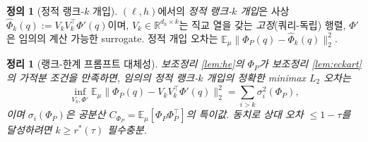 \documentclass[11pt]{article}
\newtheorem{theorem}{정리}
\theoremstyle{definition}
\newtheorem{definition}{정의}
\newcommand{\R}{\mathbb{R}}
\newcommand{\E}{\mathbb{E}}
\newcommand{\Phip}{\Phi_P}
\newcommand{\dh}{d_h}
\begin{document}
\begin{definition}[정적 랭크-$k$ 개입]
\label{def:static-k}
$(\ell,h)$에서의 \emph{정적 랭크-$k$ 개입}은 사상 $\widehat{\Phi}_k(q) := V_k V_k^\top \Phi'(q)$이며, $V_k \in \R^{\dh\times k}$는 직교 열을 갖는 \emph{고정}(쿼리-독립) 행렬, $\Phi'$은 임의의 계산 가능한 surrogate. 정적 개입 오차는 $\E_\mu \|\Phip(q) - \widehat{\Phi}_k(q)\|_2^2$.
\end{definition}

\begin{theorem}[랭크-한계 프롬프트 대체성]
\label{thm:rank-bound}
보조정리 \ref{lem:he}의 $\Phip$가 보조정리 \ref{lem:eckart}의 가적분 조건을 만족하면, 임의의 정적 랭크-$k$ 개입의 정확한 minimax $L_2$ 오차는
\begin{equation}
\inf_{V_k, \Phi'} \E_\mu \bigl\|\Phip(q) - V_k V_k^\top \Phi'(q)\bigr\|_2^2 = \sum_{i>k}\sigma_i^2(\Phip),
\label{eq:rank-bound}
\end{equation}
이며 $\sigma_i(\Phip)$은 공분산 $C_{\Phip} = \E_\mu[\Phip\Phip^\top]$의 특이값. 동치로 상대 오차 $\le 1-\tau$를 달성하려면 $k \ge r^*(\tau)$ 필수충분.
\end{theorem}
\end{document}

